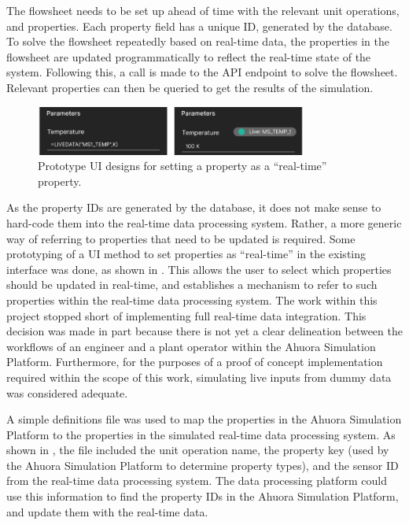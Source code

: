 The flowsheet needs to be set up ahead of time with the relevant unit operations, and properties. Each property field has a unique ID, generated by the database. To solve the flowsheet repeatedly based on real-time data, the properties in the flowsheet are updated programmatically to reflect the real-time state of the system. Following this, a call is made to the API endpoint to solve the flowsheet. Relevant properties can then be queried to get the results of the simulation.

\begin{figure}
    \centering
    \includegraphics[width=0.8\textwidth]{property_ui.png}
    \caption{Prototype UI designs for setting a property as a ``real-time'' property.}
    \label{fig:property-ui}
\end{figure}

As the property IDs are generated by the database, it does not make sense to hard-code them into the real-time data processing system. Rather, a more generic way of referring to properties that need to be updated is required. 
Some prototyping of a UI method to set properties as ``real-time'' in the existing interface was done, as shown in . 
This allows the user to select which properties should be updated in real-time, and establishes a mechanism to refer to such properties within the real-time data processing system. 
The work within this project stopped short of implementing full real-time data integration. This decision was made in part because there is not yet a clear delineation between the workflows of an engineer and a plant operator within the Ahuora Simulation Platform. Furthermore, for the purposes of a proof of concept implementation required within the scope of this work, simulating live inputs from dummy data was considered adequate.

A simple definitions file was used to map the properties in the Ahuora Simulation Platform to the properties in the simulated real-time data processing system. 
As shown in , the file included the unit operation name, the property key (used by the Ahuora Simulation Platform to determine property types), and the sensor ID from the real-time data processing system. 
The data processing platform could use this information to find the property IDs in the Ahuora Simulation Platform, and update them with the real-time data.

